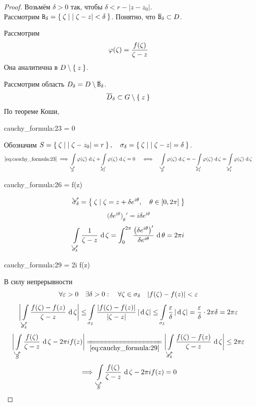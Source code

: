 \begin{proof}
	Возьмём $ \delta > 0 $ так, чтобы $ \delta < r - |z - z_0| $. \\
	Рассмотрим $ \mathtt B_\delta = \Set{\zeta \mid |\zeta - z| < \delta} $. Понятно, что $ \overline{\mathtt B}_\delta \subset D $.

	Рассмотрим
	$$ \varphi(\zeta) = \frac{f(\zeta)}{\zeta - z} $$
	Она аналитична в $ D \setminus \Set{z} $.

	Рассмотрим область $ D_\delta = D \setminus \overline{\mathtt B}_\delta $.
	$$ \overline D_\delta \subset G \setminus \Set z $$
	По теореме Коши,
	\begin{equ}{cauchy_formula:23}
		 = 0
	\end{equ}
	Обозначим $ S = \Set{\zeta \mid |\zeta - z_0| = r}, \quad \sigma_\delta = \Set{\zeta \mid |\zeta - z| = \delta} $.
	$$ \eref{cauchy_formula:23} \implies \cint[\zeta]{\curvedir S}{\vphi(\zeta)} + \cint[\zeta]{\curvedir[0]{\sigma_\delta}}{\phi(\zeta)} = 0 \quad \iff \quad \cint[\zeta]{\curvedir S}{\vphi(\zeta)} = - \cint[\zeta]{\curvedir[0]{\sigma_\delta}}{\vphi(\zeta)} = \cint[\zeta]{\curvedir{\sigma_\delta}}{\vphi(\zeta)} $$
	\begin{equ}{cauchy_formula:26}
		 = f(z) 
	\end{equ}
	$$ \curvedir{\sigma_\delta} = \set{\zeta \mid \zeta = z + \delta e^{i\theta}, \quad \theta \in [0, 2\pi]} $$
	$$ \bigg( \delta e^{i\theta} \bigg)_\theta' = i \delta e^{i\theta} $$
	$$ \cint[\zeta]{\curvedir{\sigma_\delta}}{\frac1{\zeta - z}} = \dint[\theta]0{2\pi}{\frac{\big( \delta e^{i\theta} \big)'}{\delta e^{i\theta}}} = 2\pi i $$
	\begin{equ}{cauchy_formula:29}
		  = 2\pi i f(z)
	\end{equ}
	В силу непрерывности
	$$ \forall \varepsilon > 0 \quad \exists \delta > 0 : \quad \forall \zeta \in \sigma_\delta \quad |f(\zeta) - f(z)| < \varepsilon $$
	$$ \bigg| \cint[\zeta]{\curvedir{\sigma_\delta}}{\frac{f(\zeta) - f(z)}{\zeta - z}} \bigg| \le \acint[\zeta]{\sigma_\delta}{\frac{|f(\zeta) - f(z)|}{|\zeta - z|}} \le \acint[\zeta]{\sigma_\delta}{\frac\eps\delta} = \frac\eps\delta \cdot 2\pi \delta = 2\pi \eps $$
	$$ \bigg| \cint[\zeta]{\curvedir S}{ \frac{f(\zeta)}{\zeta - z}} - 2 \pi i f(z) \bigg| \undereq{\eref{cauchy_formula:29}} \bigg| \cint[\zeta]{\curvedir{\sigma_\delta}}{\frac{f(\zeta) - f(z)}{\zeta - z}} \bigg| \le 2\pi \eps $$
	$$ \implies \cint[\zeta]{\curvedir S}{\frac{f(\zeta)}{\zeta - z}} - 2\pi i f(z) = 0 $$
\end{proof}

